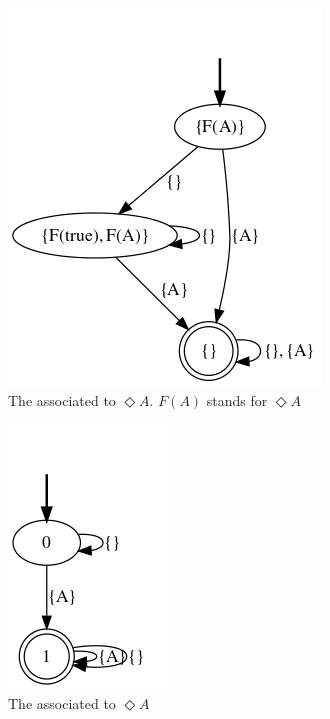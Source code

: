 \begin{example}
	\begin{figure}[h!]
		\centering
		\caption{The \NFA associated to $\Diamond A$. $F(A)$ stands for $\Diamond A$}\label{fig:nfa-eventually-a}
		\includegraphics[width=.4\linewidth]{images/ltlf-eventuallyA-nfa}
	\end{figure}
	\begin{figure}[h!]
		\centering
		\caption{The \DFA associated to $\Diamond A$}\label{fig:dfa-eventually-a}
		\includegraphics[width=.3\linewidth]{images/ltlf-eventuallyA-dfa}
	\end{figure}
	
\end{example}

